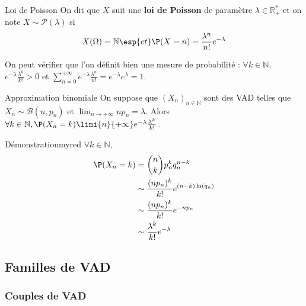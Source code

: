     \begin{defi}{Loi de Poisson}{}
        On dit que $X$ suit une \textbf{loi de Poisson} de paramètre $\lambda \in \mathbb{R}_+^*$ et on note $X \sim \mathcal{P}(\lambda)$ si 
        \[ X(\Omega) = \mathbb{N} \esp{et} \P(X = n) = \frac{\lambda^n}{n!} e^{-\lambda} \]   
    \end{defi}

    On peut vérifier que l’on définit bien une mesure de probabilité : $\forall k \in \mathbb{N}$, $e^{-\lambda} \frac{\lambda^k}{k!} > 0$ et $\sum_{n=0}^{+\infty} e^{-\lambda} \frac{\lambda^n}{n!} = e^{-\lambda} e^{\lambda} = 1$.

    \begin{theo}{Approximation binomiale}
        On suppose que $(X_n)_{n \in \mathbb{N}}$ sont des VAD telles que $X_n \sim \mathcal{B}(n,p_n)$ et $\lim_{n \to +\infty} n p_n = \lambda$. Alors $\forall k \in \mathbb{N}, \P(X_n = k) \limi{n}{+\infty} e^{-\lambda} \frac{\lambda^k}{k!}$.
    \end{theo}

    \begin{demo}{Démonstration}{myred}
        $\forall k \in \mathbb{N}$, 
        \begin{align*}
            \P(X_n = k) &= \binom{n}{k} p_n^k q_n^{n-k} \\
            &\sim \frac{(np_n)^k}{k!} e^{(n-k)\ln(q_n)} \\
            &\sim \frac{(np_n)^k}{k!} e^{-n p_n} \\
            &\sim \frac{\lambda^k}{k!} e^{-\lambda}
        \end{align*}
    \end{demo}

\subsection{Familles de VAD}
    
    \subsubsection{Couples de VAD}

